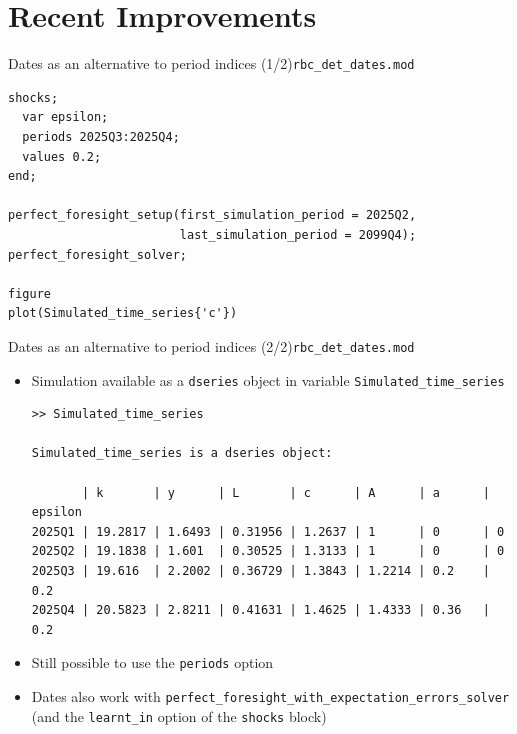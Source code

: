 \documentclass[handout,usepdftitle=false,xcolor=dvipsnames,aspectratio=169]{beamer}
\begin{document}
\section{Recent Improvements}

\begin{frame}[fragile]{Dates as an alternative to period indices (1/2)}{\texttt{rbc\_det\_dates.mod}}

  \begin{verbatim}
shocks;
  var epsilon;
  periods 2025Q3:2025Q4;
  values 0.2;
end;

perfect_foresight_setup(first_simulation_period = 2025Q2,
                        last_simulation_period = 2099Q4);
perfect_foresight_solver;

figure
plot(Simulated_time_series{'c'})

\end{verbatim}
\end{frame}

\begin{frame}[fragile]{Dates as an alternative to period indices (2/2)}{\texttt{rbc\_det\_dates.mod}}
  \begin{itemize}
    \item Simulation available as a \texttt{dseries} object in variable \texttt{Simulated\_time\_series}
          \begin{verbatim}
>> Simulated_time_series
 
Simulated_time_series is a dseries object:
 
       | k       | y      | L       | c      | A      | a      | epsilon
2025Q1 | 19.2817 | 1.6493 | 0.31956 | 1.2637 | 1      | 0      | 0      
2025Q2 | 19.1838 | 1.601  | 0.30525 | 1.3133 | 1      | 0      | 0      
2025Q3 | 19.616  | 2.2002 | 0.36729 | 1.3843 | 1.2214 | 0.2    | 0.2    
2025Q4 | 20.5823 | 2.8211 | 0.41631 | 1.4625 | 1.4333 | 0.36   | 0.2    

\end{verbatim}

    \item Still possible to use the \texttt{periods} option
    \item Dates also work with
          \texttt{perfect\_foresight\_with\_expectation\_errors\_solver} (and the
          \texttt{learnt\_in} option of the \texttt{shocks} block)
  \end{itemize}

\end{frame}
\end{document}
